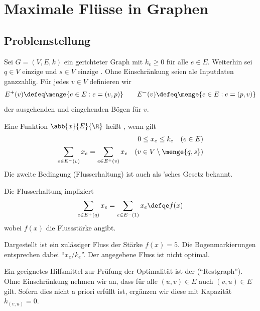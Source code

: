 \section{Maximale Flüsse in Graphen}

\subsection{Problemstellung}

Sei $G = (V,E,k)$ ein gerichteter Graph mit  $k_e \ge 0$ für alle $e \in E$. Weiterhin sei $q \in V$ einzige  und $s \in V$ einzige . Ohne Einschränkung seien ale Inputdaten ganzzahlig. Für jedes $v \in V$ definieren wir
\begin{equation*}
	E^+(v) \defeq \menge{e \in E : e = (v,p)} \qquad E^-(v) \defeq \menge{e \in E : e = (p,v)}
\end{equation*}
der ausgehenden und eingehenden Bögen für $v$.

\begin{definition}
	Eine Funktion $\abb{x}{E}{\R}$ heißt , wenn gilt
	\begin{equation*}
		\begin{aligned}
			0 \le x_e \le k_e \quad (e \in E) \\
			\sum_{e \in E^-(v)} x_e = \sum_{e \in E^+(v)} x_e \quad (v \in V \setminus \menge{q,s})
		\end{aligned}
	\end{equation*}
	Die zweite Bedingung (Flusserhaltung) ist auch als 'sches Gesetz bekannt.
\end{definition}

Die Flusserhaltung impliziert 
\begin{equation*}
	\sum_{e \in E^+(q)} x_e = \sum_{e \in E^-(1)} x_e \defqe f(x)
\end{equation*}
wobei $f(x)$ die Flussstärke angibt.

\begin{beispiel} \label{beispiel: 5.3}

	Dargestellt ist ein zulässiger Fluss der Stärke $f(x) = 5$. Die Bogenmarkierungen entsprechen dabei \enquote{$x_e / k_e$}. Der angegebene Fluss ist nicht optimal.
\end{beispiel}

Ein geeignetes Hilfsmittel zur Prüfung der Optimalität ist der  (\enquote{Restgraph}). Ohne Einschränkung nehmen wir an, dass für alle $(u,v) \in E$ auch $(v,u) \in E$ gilt. Sofern dies nicht a priori erfüllt ist, ergänzen wir diese mit Kapazität $k_{(v,u)} = 0$.

